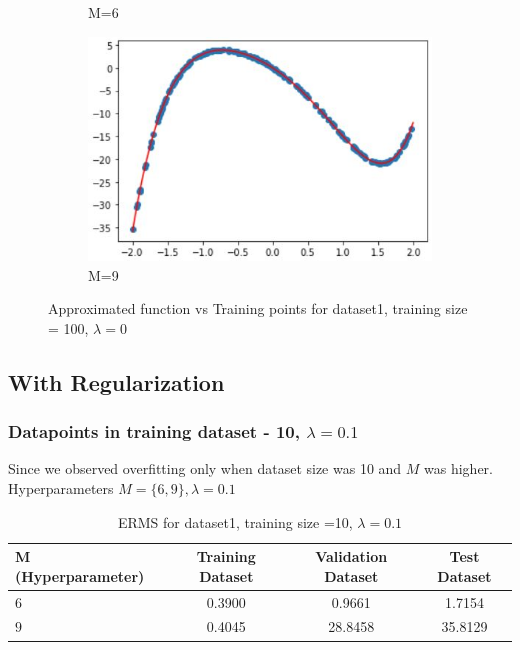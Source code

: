 \documentclass[11pt]{article}
\begin{document}
\begin{figure}[h]
\begin{subfigure}[b]{0.45\textwidth}
	\caption{    M=6}
	\label{fig:fig1.1.2.3}
	\end{subfigure}
	\hfill
	\begin{subfigure}[b]{0.45\textwidth}
	\centering
	\includegraphics[scale=0.7]{dataset1_200_lambda0_m9funcplot.jpg}
	\caption{    M=9}
	\label{fig:fig1.1.2.4}
	\end{subfigure}
\caption{Approximated function vs Training points for dataset1, training size = 100, $\lambda = 0$}
\label{fig:fig1.1.2}
\end{figure}

\newpage

\subsection{With Regularization}
\subsubsection{Datapoints in training dataset - 10, $\lambda = 0.1$}

Since we observed overfitting only when dataset size was 10 and $M$ was higher.\\
Hyperparameters $M = \{6,9\}, \lambda = 0.1$
\begin{table}[h]
\label{tab:tab1.2.1}
\begin{center}
\begin{tabular}{|l|c|c|c|}
\hline
\textbf{M (Hyperparameter)} & \textbf{Training Dataset} & \textbf{Validation Dataset} &\textbf{Test Dataset}\\
\hline
$6$ & 0.3900 & 0.9661 & 1.7154\\
\hline
$9$ & 0.4045 & 28.8458 & 35.8129\\
\hline
\end{tabular}
\caption{ERMS for dataset1, training size =10, $\lambda = 0.1$}
\end{center}
\end{table}
\end{document}
